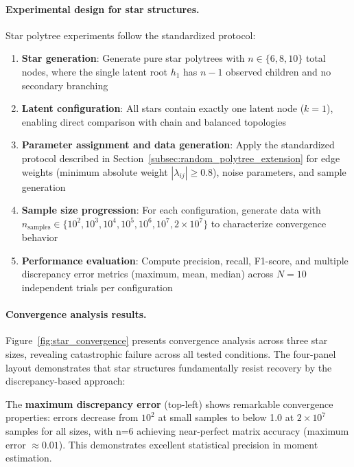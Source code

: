 \documentclass[11pt,a4paper]{article}
\numberwithin{equation}{section}
\begin{document}
\paragraph{Experimental design for star structures.} Star polytree experiments follow the standardized protocol:

\begin{enumerate}[label=(\arabic*)]
\item \textbf{Star generation}: Generate pure star polytrees with $n \in \{6, 8, 10\}$ total nodes, where the single latent root $h_1$ has $n-1$ observed children and no secondary branching

\item \textbf{Latent configuration}: All stars contain exactly one latent node ($k=1$), enabling direct comparison with chain and balanced topologies

\item \textbf{Parameter assignment and data generation}: Apply the standardized protocol described in Section~\ref{subsec:random_polytree_extension} for edge weights (minimum absolute weight $|\lambda_{ij}| \geq 0.8$), noise parameters, and sample generation

\item \textbf{Sample size progression}: For each configuration, generate data with $n_{\text{samples}} \in \{10^2, 10^3, 10^4, 10^5, 10^6, 10^7, 2 \times 10^7\}$ to characterize convergence behavior

\item \textbf{Performance evaluation}: Compute precision, recall, F1-score, and multiple discrepancy error metrics (maximum, mean, median) across $N = 10$ independent trials per configuration
\end{enumerate}

\paragraph{Convergence analysis results.} Figure~\ref{fig:star_convergence} presents convergence analysis across three star sizes, revealing catastrophic failure across all tested conditions. The four-panel layout demonstrates that star structures fundamentally resist recovery by the discrepancy-based approach:

The \textbf{maximum discrepancy error} (top-left) shows remarkable convergence properties: errors decrease from $10^2$ at small samples to below 1.0 at $2 \times 10^7$ samples for all sizes, with n=6 achieving near-perfect matrix accuracy (maximum error $\approx 0.01$). This demonstrates excellent statistical precision in moment estimation.
\end{document}
